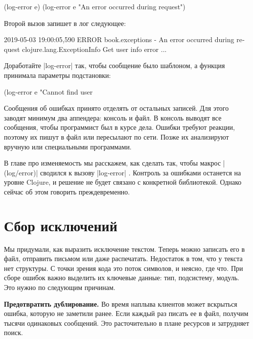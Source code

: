 \begin{english}
  \begin{clojure}
(log-error e)
(log-error e "An error occurred during request")
  \end{clojure}
\end{english}

Второй вызов запишет в лог следующее:

\begin{english}
  \begin{text}
2019-05-03 19:00:05,590 ERROR book.exceptions - An error occurred during request
clojure.lang.ExceptionInfo
  Get user info error
  ...
  \end{text}
\end{english}

Доработайте \spverb|log-error| так, чтобы сообщение было шаблоном, а функция
принимала параметры подстановки:

\begin{english}
  \begin{clojure}
(log-error e "Cannot find user %
  \end{clojure}
\end{english}

Сообщения об ошибках принято отделять от остальных записей. Для этого заводят
минимум два аппендера: консоль и файл. В консоль выводят все сообщения, чтобы
программист был в курсе дела. Ошибки требуют реакции, поэтому их пишут в файл
или пересылают по сети. Позже их анализируют вручную или специальными
программами.

В главе про изменяемость мы расскажем, как сделать так, чтобы макрос
\spverb|(log/error)| сводился к вызову \spverb|log-error| .
Контроль за ошибками останется на уровне Clojure, и решение не будет связано с
конкретной библиотекой. Однако сейчас об этом говорить преждевременно.

\section{Сбор исключений}

Мы придумали, как выразить исключение текстом. Теперь можно записать его в файл,
отправить письмом или даже распечатать. Недостаток в том, что у текста нет
структуры. С точки зрения кода это поток символов, и неясно, где что. При сборе
ошибок важно выделить их ключевые данные: тип, подсистему, модуль. Это нужно по
следующим причинам.

\textbf{Предотвратить дублирование.} Во время наплыва клиентов может вскрыться
ошибка, которую не заметили ранее. Если каждый раз писать ее в файл, получим
тысячи одинаковых сообщений. Это расточительно в плане ресурсов и затрудняет
поиск.

